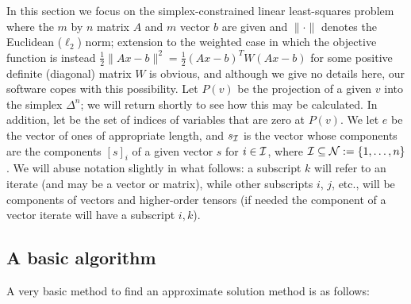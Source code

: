 \documentclass[12pt,twoside]{article}
\renewcommand{\half}{\frac{1}{2}}
\begin{document}
In this section we focus on the simplex-constrained linear least-squares
problem
\eqn{slls}{\minimizeover{x \in \Delta^n}
 f(x) \define \half \| A x - b \|^2,}
where the $m$ by $n$ matrix $A$ and $m$ vector $b$ are given
and $\|\cdot\|$ denotes the Euclidean ($\ell_2$) norm;
extension to the weighted case in which the objective function is
instead $\half \| A x - b \|^2 = \half (Ax-b)^T W (Ax-b)$ for some
positive definite (diagonal) matrix $W$ is obvious, and although we
give no details here, our software copes with this possibility.
Let $P(v)$ be the projection of a given $v$ into the simplex $\Delta^n$;
we will return shortly to see how this may be calculated. In addition, let
be the set of indices of variables that are zero at $P(v)$. We let
$e$ be the vector of ones of appropriate length, and $s_{{\cal I}}$ is the
vector whose components
are the components $[s]_i$ of a given vector $s$ for $i \in {\cal I}$,
where ${\cal I} \subseteq {\cal N} := \{1,\ldots,n\}$.
We will abuse notation slightly in what follows: a subscript $k$ will
refer to an iterate (and may be a vector or matrix), while other
subscripts $i$, $j$,
etc., will be components of vectors and higher-order tensors (if needed
the component of a vector iterate will have a subscript $i,k$).

\newpage

\subsection{A basic algorithm}

A very basic method to find an approximate solution method is as follows:
\end{document}
